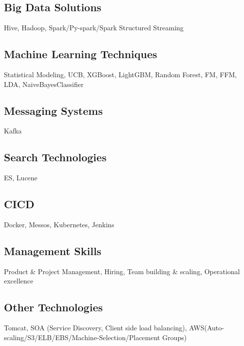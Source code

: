 \documentclass[8pt,a4paper]{article}
\begin{document}
\begin{multicols}{2}
\subsection{Big Data Solutions}
Hive, Hadoop, Spark/Py-spark/Spark Structured Streaming
\subsection{Machine Learning Techniques}
Statistical Modeling, UCB, XGBoost, LightGBM, Random Forest, FM, FFM, LDA, NaiveBayesClassifier
\subsection{Messaging Systems}
Kafka
\subsection{Search Technologies}
ES, Lucene
\subsection{CICD}
Docker, Messos, Kubernetes, Jenkins
\subsection{Management Skills}
Product \& Project Management, Hiring, Team building \& scaling, Operational excellence
\subsection{Other Technologies}
Tomcat, SOA (Service Discovery, Client side load balancing), AWS(Auto-scaling/S3/ELB/EBS/Machine-Selection/Placement Groups)



\end{multicols}
\end{document}
